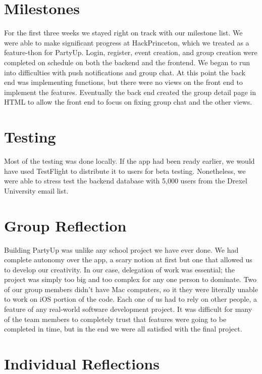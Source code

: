 \documentclass[12pt]{article}
\begin{document}
\bigskip

\section{Milestones}

For the first three weeks we stayed right on track with our milestone list. 
We were able to make significant progress at HackPrinceton, which we treated as a feature-thon for PartyUp. 
Login, register, event creation, and group creation were completed on schedule on both the backend and the frontend. 
We began to run into difficulties with push notifications and group chat. 
At this point the back end was implementing functions, but there were no views on the front end to implement the features. 
Eventually the back end created the group detail page in HTML to allow the front end to focus on fixing group chat and the other views. 

\bigskip

\section{Testing}

Most of the testing was done locally. 
If the app had been ready earlier, we would have used TestFlight to distribute it to users for beta testing. 
Nonetheless, we were able to stress test the backend database with 5,000 users from the Drexel University email list.

\section{Group Reflection}

Building PartyUp was unlike any school project we have ever done. 
We had complete autonomy over the app, a scary notion at first but one that allowed us to develop our creativity. 
In our case, delegation of work was essential; the project was simply too big and too complex for any one person to dominate. 
Two of our group members didn't have Mac computers, so it they were literally unable to work on iOS portion of the code. 
Each one of us had to rely on other people, a feature of any real-world software development project. 
It was difficult for many of the team members to completely trust that features were going to be completed in time, but in the end we were all satisfied with the final project.

\bigskip

\section{Individual Reflections}
\end{document}
